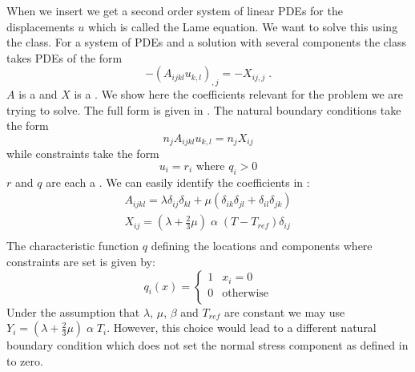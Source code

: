 When we insert  we get a second order system
of linear PDEs for the displacements $u$ which is called the Lame equation.
We want to solve this using the \LinearPDE class.
For a system of PDEs and a solution with several components the \LinearPDE class takes PDEs of the form
\begin{equation}\label{LINEARPDE.SYSTEM.1 TUTORIAL}
-(A_{ijkl} u_{k,l})_{,j}=-X_{ij,j} \; .
\end{equation}
$A$ is a \RankFour and $X$ is a \RankTwo.
We show here the coefficients relevant for the problem we are trying to solve.
The full form is given in .
The natural boundary conditions take the form
\begin{equation}\label{LINEARPDE.SYSTEM.2 TUTORIAL}
n_{j} A_{ijkl} u_{k,l}=n_{j}X_{ij}
\end{equation}
while constraints take the form
\begin{equation}\label{LINEARPDE.SYSTEM.3 TUTORIAL}
u_{i}=r_{i} \mbox{ where } q_{i}>0
\end{equation}
$r$ and $q$ are each a \RankOne.
We can easily identify the coefficients in :
\begin{eqnarray}\label{LINEARPDE ELASTIC COEFFICIENTS}
A_{ijkl}=\lambda \delta_{ij} \delta_{kl} + \mu (
\delta_{ik} \delta_{jl}
+ \delta_{il} \delta_{jk}) \\
X_{ij}=(\lambda+\frac{2}{3} \mu) \;  \alpha \; (T-T_{ref})\delta_{ij} \\
\end{eqnarray}
The characteristic function $q$ defining the locations and components where constraints are set is given by:
\begin{equation}\label{HEATEDBLOCK MASK}
q_{i}(x)=\left\{
\begin{array}{cl}
1 & x_{i}=0\\
0 & \mbox{otherwise}\\
\end{array}
\right.
\end{equation}
Under the assumption that $\lambda$, $\mu$, $\beta$ and $T_{ref}$
are constant we may use $Y_{i}=(\lambda+\frac{2}{3} \mu) \; \alpha \; T_{i}$.
However, this choice would lead to a different natural boundary condition
which does not set the normal stress component as defined in  to zero.

